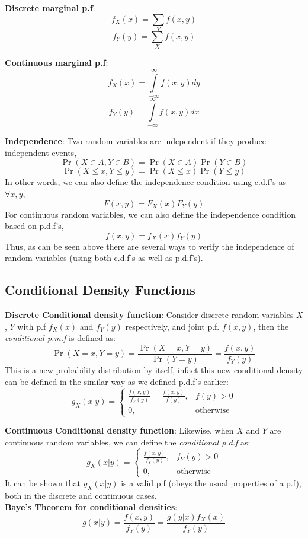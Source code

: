 \documentclass[english, 11pt]{article}
\begin{document}
{\bf Discrete marginal p.f}:
\[ f_X (x) = \sum_{Y} f(x, y) \]
\[ f_Y (y) = \sum_{X} f(x, y) \]

{\bf Continuous marginal p.f}:
\[ f_X (x) = \int\limits_{-\infty}^{\infty} f(x, y) dy \]
\[ f_Y (y) = \int\limits_{-\infty}^{\infty} f(x, y) dx \]

{\bf Independence}: Two random variables are independent if they produce independent events, 
\[ \Pr(X \in A, Y \in B) = \Pr(X \in A) \Pr(Y \in B) \]
\[ \Pr(X \le x, Y \le y) = \Pr(X \le x) \Pr(Y \le y) \]
In other words, we can also define the independence condition using c.d.f's as $\forall x, y$,
\[ F(x, y) = F_X (x) F_Y (y) \]
For continuous random variables, we can also define the independence condition based on p.d.f's,
\[ f(x, y) = f_X (x) f_Y (y) \]
Thus, as can be seen above there are several ways to verify the independence of random variables (using both c.d.f's as well as p.d.f's).

\subsection{Conditional Density Functions}
{\bf Discrete Conditional density function}: Consider discrete random variables $X$, $Y$ with p.f $f_X (x)$ and $f_Y (y)$ respectively, and joint p.f. $f(x, y)$, then the {\it conditional p.m.f } is defined as:
\[ \Pr(X=x, Y=y) = \frac{\Pr(X=x, Y=y)}{\Pr(Y=y)} = \frac{f(x, y)}{f_Y (y)} \]
This is a new probability distribution by itself, infact this new conditional density can be defined in the similar way as we defined p.d.f's earlier:
\[ g_X (x|y) = 
\begin{cases}
     \frac{f(x, y)}{f_Y (y)} = \frac{f(x, y)}{f(y)}, & f(y) > 0 \\
     0, & \text{otherwise}
\end{cases}
\]

{\bf Continuous Conditional density function}: Likewise, when $X$ and $Y$ are continuous random variables, we can define the {\it conditional p.d.f} as:
\[ g_X (x|y) = 
\begin{cases}
     \frac{f(x, y)}{f_Y (y)}, & f_Y (y) > 0 \\
     0, & \text{otherwise}
\end{cases}
\]
It can be shown that $g_X (x|y)$ is a valid p.f (obeys the usual properties of a p.f), both in the discrete and continuous cases. \\

{\bf Baye's Theorem for conditional densities}: 
\[ g(x | y) = \frac{f(x, y)}{f_Y (y)} = \frac{g(y|x) f_X (x)}{f_Y (y)} \]
\end{document}
